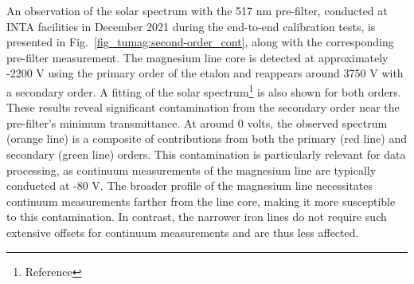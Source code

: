 An observation of the solar spectrum with the 517 nm pre-filter, conducted at INTA facilities in December 2021 during the end-to-end calibration tests, is presented in Fig.~\ref{fig_tumag:second-order_cont}, along with the corresponding pre-filter measurement. The magnesium line core is detected at approximately -2200 V using the primary order of the etalon and reappears around 3750 V with a secondary order. A fitting of the solar spectrum\footnote{Reference} is also shown for both orders. These results reveal significant contamination from the secondary order near the pre-filter's minimum transmittance. At around 0 volts, the observed spectrum (orange line) is a composite of contributions from both the primary (red line) and secondary (green line) orders. This contamination is particularly relevant for data processing, as continuum measurements of the magnesium line are typically conducted at -80 V. The broader profile of the magnesium line necessitates continuum measurements farther from the line core, making it more susceptible to this contamination. In contrast, the narrower iron lines do not require such extensive offsets for continuum measurements and are thus less affected.


